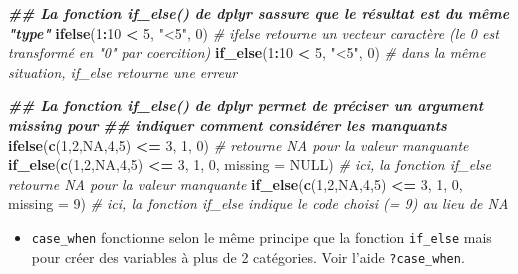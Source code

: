 \documentclass[
]{book}
\newenvironment{Shaded}{\begin{snugshade}}{\end{snugshade}}
\newcommand{\AttributeTok}[1]{\textcolor[rgb]{0.13,0.29,0.53}{#1}}
\newcommand{\CommentTok}[1]{\textcolor[rgb]{0.56,0.35,0.01}{\textit{#1}}}
\newcommand{\ConstantTok}[1]{\textcolor[rgb]{0.56,0.35,0.01}{#1}}
\newcommand{\DecValTok}[1]{\textcolor[rgb]{0.00,0.00,0.81}{#1}}
\newcommand{\DocumentationTok}[1]{\textcolor[rgb]{0.56,0.35,0.01}{\textbf{\textit{#1}}}}
\newcommand{\FunctionTok}[1]{\textcolor[rgb]{0.13,0.29,0.53}{\textbf{#1}}}
\newcommand{\NormalTok}[1]{#1}
\newcommand{\SpecialCharTok}[1]{\textcolor[rgb]{0.81,0.36,0.00}{\textbf{#1}}}
\newcommand{\StringTok}[1]{\textcolor[rgb]{0.31,0.60,0.02}{#1}}
\providecommand{\tightlist}{%
  \setlength{\itemsep}{0pt}\setlength{\parskip}{0pt}}
\begin{document}
\begin{Shaded}
\begin{Highlighting}[]
\DocumentationTok{\#\# La fonction if\_else() de dplyr s\textquotesingle{}assure que le résultat est du même "type"}
\FunctionTok{ifelse}\NormalTok{(}\DecValTok{1}\SpecialCharTok{:}\DecValTok{10} \SpecialCharTok{\textless{}} \DecValTok{5}\NormalTok{, }\StringTok{"\textless{}5"}\NormalTok{, }\DecValTok{0}\NormalTok{) }
\CommentTok{\# ifelse retourne un vecteur caractère (le 0 est transformé en "0" par coercition)}
\FunctionTok{if\_else}\NormalTok{(}\DecValTok{1}\SpecialCharTok{:}\DecValTok{10} \SpecialCharTok{\textless{}} \DecValTok{5}\NormalTok{, }\StringTok{"\textless{}5"}\NormalTok{, }\DecValTok{0}\NormalTok{) }\CommentTok{\# dans la même situation, if\_else retourne une erreur }

\DocumentationTok{\#\# La fonction if\_else() de dplyr permet de préciser un argument missing pour }
\DocumentationTok{\#\# indiquer comment considérer les manquants}
\FunctionTok{ifelse}\NormalTok{(}\FunctionTok{c}\NormalTok{(}\DecValTok{1}\NormalTok{,}\DecValTok{2}\NormalTok{,}\ConstantTok{NA}\NormalTok{,}\DecValTok{4}\NormalTok{,}\DecValTok{5}\NormalTok{) }\SpecialCharTok{\textless{}=} \DecValTok{3}\NormalTok{, }\DecValTok{1}\NormalTok{, }\DecValTok{0}\NormalTok{) }\CommentTok{\# retourne NA pour la valeur manquante}
\FunctionTok{if\_else}\NormalTok{(}\FunctionTok{c}\NormalTok{(}\DecValTok{1}\NormalTok{,}\DecValTok{2}\NormalTok{,}\ConstantTok{NA}\NormalTok{,}\DecValTok{4}\NormalTok{,}\DecValTok{5}\NormalTok{) }\SpecialCharTok{\textless{}=} \DecValTok{3}\NormalTok{, }\DecValTok{1}\NormalTok{, }\DecValTok{0}\NormalTok{, }\AttributeTok{missing =} \ConstantTok{NULL}\NormalTok{) }
\CommentTok{\# ici, la fonction if\_else retourne NA pour la valeur manquante}
\FunctionTok{if\_else}\NormalTok{(}\FunctionTok{c}\NormalTok{(}\DecValTok{1}\NormalTok{,}\DecValTok{2}\NormalTok{,}\ConstantTok{NA}\NormalTok{,}\DecValTok{4}\NormalTok{,}\DecValTok{5}\NormalTok{) }\SpecialCharTok{\textless{}=} \DecValTok{3}\NormalTok{, }\DecValTok{1}\NormalTok{, }\DecValTok{0}\NormalTok{, }\AttributeTok{missing =} \DecValTok{9}\NormalTok{) }
\CommentTok{\# ici, la fonction if\_else indique le code choisi (= 9) au lieu de NA}
\end{Highlighting}
\end{Shaded}

\begin{itemize}
\tightlist
\item
  \texttt{case\_when} fonctionne selon le même principe que la fonction \texttt{if\_else} mais pour créer des variables à plus de 2 catégories. Voir l'aide \texttt{?case\_when}.
\end{itemize}
\end{document}
